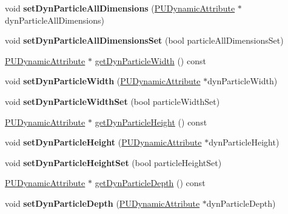 \begin{DoxyCompactItemize}
void {\bfseries set\+Dyn\+Particle\+All\+Dimensions} (\hyperlink{classPUDynamicAttribute}{P\+U\+Dynamic\+Attribute} $\ast$dyn\+Particle\+All\+Dimensions)
\item 
\mbox{\label{classPUEmitter_a7b31b4e740fe69282c184efe7a910193}} 
void {\bfseries set\+Dyn\+Particle\+All\+Dimensions\+Set} (bool particle\+All\+Dimensions\+Set)
\item 
\hyperlink{classPUDynamicAttribute}{P\+U\+Dynamic\+Attribute} $\ast$ \hyperlink{classPUEmitter_a0ec28ae4cf2f12af44f7dbb7a52a1e69}{get\+Dyn\+Particle\+Width} () const
\item 
\mbox{\label{classPUEmitter_a405fb78092643f57496e8fabdd9d0c5d}} 
void {\bfseries set\+Dyn\+Particle\+Width} (\hyperlink{classPUDynamicAttribute}{P\+U\+Dynamic\+Attribute} $\ast$dyn\+Particle\+Width)
\item 
\mbox{\label{classPUEmitter_a2977f08f86a9fde77d2440890e4057cc}} 
void {\bfseries set\+Dyn\+Particle\+Width\+Set} (bool particle\+Width\+Set)
\item 
\hyperlink{classPUDynamicAttribute}{P\+U\+Dynamic\+Attribute} $\ast$ \hyperlink{classPUEmitter_af66312c994c7405a9ccda00544010d3a}{get\+Dyn\+Particle\+Height} () const
\item 
\mbox{\label{classPUEmitter_ae68d29fc4a0298984ef9c4596e0b2e4a}} 
void {\bfseries set\+Dyn\+Particle\+Height} (\hyperlink{classPUDynamicAttribute}{P\+U\+Dynamic\+Attribute} $\ast$dyn\+Particle\+Height)
\item 
\mbox{\label{classPUEmitter_ae593ed969c3cf8440ea79822678c0c70}} 
void {\bfseries set\+Dyn\+Particle\+Height\+Set} (bool particle\+Height\+Set)
\item 
\hyperlink{classPUDynamicAttribute}{P\+U\+Dynamic\+Attribute} $\ast$ \hyperlink{classPUEmitter_a85a4428e2d1eb332d9f7eab2a411e56f}{get\+Dyn\+Particle\+Depth} () const
\item 
\mbox{\label{classPUEmitter_a199e6b0337e78d4fd4df4da84461278c}} 
void {\bfseries set\+Dyn\+Particle\+Depth} (\hyperlink{classPUDynamicAttribute}{P\+U\+Dynamic\+Attribute} $\ast$dyn\+Particle\+Depth)
\item 
\mbox{\label{classPUEmitter_ad0c6b343d3055d1e6d6acac2f79754e3}} 

\end{DoxyCompactItemize}

